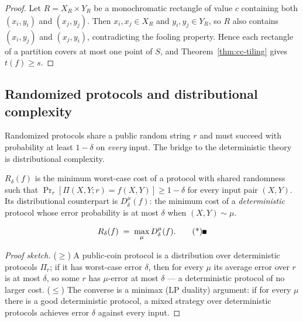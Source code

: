 \begin{proof}
Let $R = X_R \times Y_R$ be a monochromatic rectangle of value $c$ containing both
$(x_i,y_i)$ and $(x_j,y_j)$. Then $x_i, x_j \in X_R$ and $y_i, y_j \in Y_R$, so $R$ also
contains $(x_i,y_j)$ and $(x_j,y_i)$, contradicting the fooling property. Hence each
rectangle of a partition covers at most one point of $S$, and
Theorem~\ref{thm:cc-tiling} gives $t(f) \ge s$.
\end{proof}

\subsection{Randomized protocols and distributional complexity}
\label{sec:cc-rand}

Randomized protocols share a public random string $r$ and must succeed with probability
at least $1-\delta$ on \emph{every} input. The bridge to the deterministic theory is
distributional complexity.

\begin{definition}\label{def:cc-randomized}
$R_\delta(f)$ is the minimum worst-case cost of a protocol with shared randomness such
that $\Pr_r[\Pi(X,Y;r) = f(X,Y)] \ge 1-\delta$ for every input pair $(X,Y)$. Its
distributional counterpart is $D^\mu_\delta(f)$: the minimum cost of a
\emph{deterministic} protocol whose error probability is at most $\delta$ when
$(X,Y) \sim \mu$.
\end{definition}

\begin{theorem}\label{thm:cc-yao}
\[
R_\delta(f) \;=\; \max_\mu D^\mu_\delta(f). \eopm
\]
\end{theorem}

\begin{proof}[Proof sketch]
($\ge$) A public-coin protocol is a distribution over deterministic protocols $\Pi_r$;
if it has worst-case error $\delta$, then for every $\mu$ its average error over $r$ is
at most $\delta$, so some $r$ has $\mu$-error at most $\delta$ --- a deterministic
protocol of no larger cost. ($\le$) The converse is a minimax (LP duality) argument: if
for every $\mu$ there is a good deterministic protocol, a mixed strategy over
deterministic protocols achieves error $\delta$ against every input.
\end{proof}


